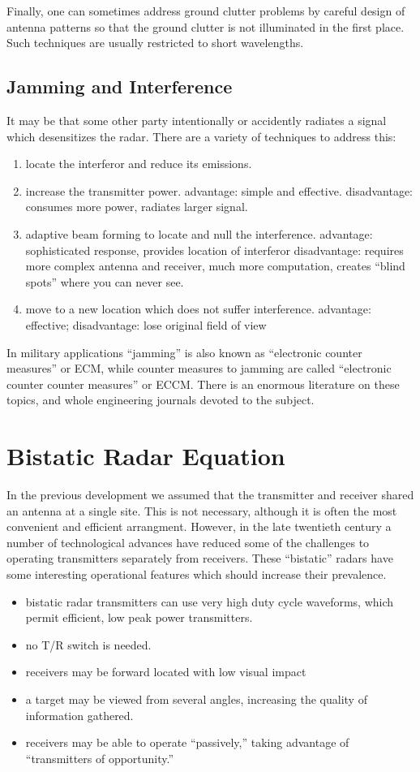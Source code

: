 Finally, one can sometimes address ground clutter problems by careful
design of antenna patterns so that the ground clutter is not
illuminated in the first place.  Such techniques are usually
restricted to short wavelengths.

\subsection{Jamming and Interference}

It may be that some other party intentionally or accidently radiates a
signal which desensitizes the radar.  There are a variety of
techniques to address this:
\begin{enumerate}
\item locate the interferor and reduce its emissions. 
\item increase the transmitter power.  advantage: simple and
effective.  disadvantage: consumes more power, radiates larger signal.
\item adaptive beam forming to locate and null the interference.
advantage: sophisticated response, provides location of interferor
disadvantage: requires more complex antenna and receiver, much more
computation, creates ``blind spots'' where you can never see.
\item move to a new location which does not suffer interference.
advantage: effective; disadvantage: lose original field of view
\end{enumerate}
In military applications ``jamming'' is also known as ``electronic
counter measures'' or ECM, while counter measures to jamming are
called ``electronic counter counter measures'' or ECCM.  There is an
enormous literature on these topics, and whole engineering journals
devoted to the subject.



\section{Bistatic Radar Equation}

In the previous development we assumed that the transmitter and
receiver shared an antenna at a single site.  This is not necessary,
although it is often the most convenient and efficient arrangment.
However, in the late twentieth century a number of technological
advances have reduced some of the challenges to operating transmitters
separately from receivers.  These ``bistatic'' radars have some
interesting operational features which should increase their
prevalence.
\begin{itemize}
\item bistatic radar transmitters can use very high duty cycle
waveforms, which permit efficient, low peak power transmitters.
\item no T/R switch is needed.
\item receivers may be forward located with low visual impact
\item a target may be viewed from several angles, increasing the
quality of information gathered.
\item receivers may be able to operate ``passively,'' taking advantage
of ``transmitters of opportunity.''
\end{itemize}

